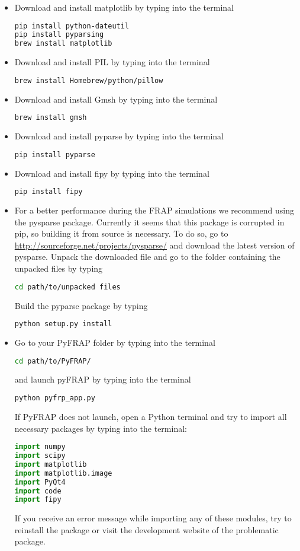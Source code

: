 \documentclass[a4paper,11pt]{article}
\begin{document}
\begin{itemize}
\item Download and install matplotlib by typing into the terminal
\begin{lstlisting}[frame=single,language=bash]  
pip install python-dateutil
pip install pyparsing 
brew install matplotlib
\end{lstlisting}
\item Download and install PIL by typing into the terminal
\begin{lstlisting}[frame=single,language=bash]  
brew install Homebrew/python/pillow
\end{lstlisting}
\item Download and install Gmsh by typing into the terminal
\begin{lstlisting}[frame=single,language=bash]  
brew install gmsh
\end{lstlisting}
\item Download and install pyparse by typing into the terminal
\begin{lstlisting}[frame=single,language=bash]  
pip install pyparse
\end{lstlisting}
\item Download and install fipy by typing into the terminal
\begin{lstlisting}[frame=single,language=bash]  
pip install fipy
\end{lstlisting}
\item For a better performance during the FRAP simulations we recommend using the pysparse package. Currently it seems that this package is corrupted in pip, so building it from source is necessary.
To do so, go to \url{http://sourceforge.net/projects/pysparse/} and download the latest version of pysparse. Unpack the downloaded file and go to the folder containing the unpacked files by typing
\begin{lstlisting}[frame=single,language=bash]  
cd path/to/unpacked files
\end{lstlisting}
Build the pyparse package by typing 
\begin{lstlisting}[frame=single,language=bash]  
python setup.py install
\end{lstlisting}
\item Go to your PyFRAP folder by typing into the terminal
\begin{lstlisting}[frame=single,language=bash]  
cd path/to/PyFRAP/
\end{lstlisting}
and launch pyFRAP by typing into the terminal
\begin{lstlisting}[frame=single,language=bash]  
python pyfrp_app.py
\end{lstlisting}
If PyFRAP does not launch, open a Python terminal and try to import all necessary packages by typing into the terminal:
\begin{lstlisting}[frame=single,language=Python]  
import numpy
import scipy
import matplotlib
import matplotlib.image
import PyQt4
import code
import fipy
\end{lstlisting}
If you receive an error message while importing any of these
modules, try to reinstall the package or visit the development website of the problematic
package.


\end{itemize}
\end{document}
